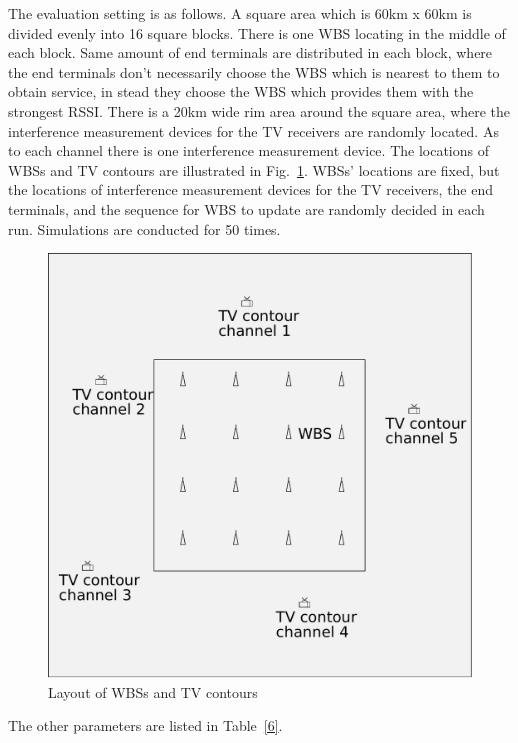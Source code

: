 \documentclass[times]{ettauth}
\theoremstyle{mytheoremstyle}
\theoremstyle{mytheoremstyle}
\theoremstyle{mytheoremstyle}
\begin{document}
The evaluation setting is as follows.
A square area which is 60km x 60km is divided evenly into 16 square blocks.
There is one WBS locating in the middle of each block.
Same amount of end terminals are distributed in each block, where the end terminals don't necessarily choose the WBS which is nearest to them to obtain service, in stead they choose the WBS which provides them with the strongest RSSI.
There is a 20km wide rim area around the square area, where the interference measurement devices for the TV receivers are randomly located.
As to each channel there is one interference measurement device.
The locations of WBSs and TV contours are illustrated in Fig.~\ref{sim:layout}.
WBSs' locations are fixed, but the locations of interference measurement devices for the TV receivers, the end terminals, and the sequence for WBS to update are randomly decided in each run.
Simulations are conducted for 50 times.

\begin{figure}[h!]
  \centering
  \includegraphics[width=0.5\linewidth]{layout.pdf}
  \caption{Layout of WBSs and TV contours}
  \label{sim:layout}
\end{figure}

The other parameters are listed in Table~\ref{6}.
\end{document}
